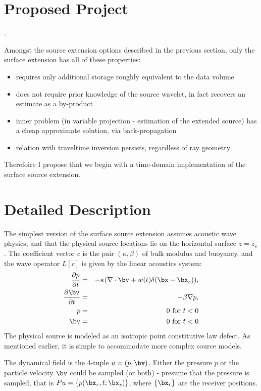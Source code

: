 \section{Proposed Project}.

Amongst the source extension options described in the previous section, only the surface extension has all of these properties:
\begin{itemize}
\item requires only additional storage roughly equivalent to the data volume
\item does not require prior knowledge of the source wavelet, in fact recovers an estimate as a by-product
\item inner problem (in variable projection - estimation of the extended source) has a cheap approximate solution, via back-propagation
\item relation with traveltime inversion persists, regardless of ray geometry
\end{itemize}

Therefoire I propose that we begin with a time-domain implementation of the surface source extension.

\section{Detailed Description}
The simplest version of the surface source extension assumes acoustic wave physics, and that the physical source locations lie on the horizontal surface $z=z_s$. The coefficient vector $c$ is the pair $(\kappa,\beta)$ of bulk modulus and buoyancy, and the wave operator $L[c]$ is given by the linear acoustics system:
\begin{eqnarray}
\label{eqn:awe}
\frac{\partial p}{\partial t} & = & - \kappa (\nabla \cdot \bv +
w(t)\delta(\bx-\bx_s)), \nonumber \\
\frac{\partial \bv}{\partial t} & = & - \beta \nabla p,\nonumber \\
p & =& 0 \mbox{ for } t<0\nonumber\\ 
\bv & = & 0 \mbox{ for } t<0 
\end{eqnarray}
The physical source is modeled as an isotropic point constitutive law defect. As mentioned earlier, it is simple to accommodate more complex source models.

The dynamical field is the 4-tuple $u=(p,\bv)$. Either the pressure $p$ or the particle velocity $\bv$ could be sampled (or both) - presume that the pressure is sampled, that is $Pu = \{p(\bx_r,t;\bx_s)\}$, where $\{\bx_r\}$ are the receiver positions. 

